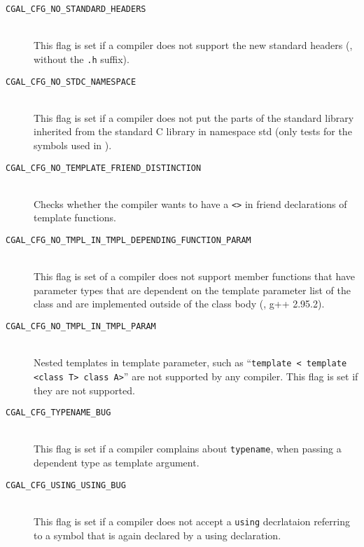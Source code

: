 \begin{description}
\item[{\tt CGAL\_CFG\_NO\_STANDARD\_HEADERS}]~\\ 
  This flag is
  set if a compiler does not support the new standard headers (\ie,
  without the {\tt .h} suffix).
 
\item[{\tt CGAL\_CFG\_NO\_STDC\_NAMESPACE}]~\\ 
  This flag is
  set if a compiler does not put the parts of the standard library
  inherited from the standard C library in namespace {\ccFont std} (only tests
  for the symbols used in \cgal).
 
\item[{\tt CGAL\_CFG\_NO\_TEMPLATE\_FRIEND\_DISTINCTION}]~\\ 
  Checks whether the compiler wants to have a \texttt{<>} in friend
  declarations of template functions.

\item[{\tt CGAL\_CFG\_NO\_TMPL\_IN\_TMPL\_DEPENDING\_FUNCTION\_PARAM}]~\\ 
  This flag is set of a compiler does not support member functions that have
  parameter types that are dependent on the template parameter list of the
  class and are implemented outside of the class body (\eg, g++ 2.95.2).
  
\item[{\tt CGAL\_CFG\_NO\_TMPL\_IN\_TMPL\_PARAM}]~\\ 
  Nested
  templates in template parameter, such as ``\texttt{template <
    template <class T> class A>}'' are not supported by any compiler.
  This flag is set if they are not supported.

\item[{\tt CGAL\_CFG\_TYPENAME\_BUG}]~\\
 This flag is set if a compiler complains about {\tt typename}, 
 when passing a dependent type as template argument.

\item[{\tt CGAL\_CFG\_USING\_USING\_BUG}]~\\
 This flag is set if a compiler does not accept a \texttt{using}
 decrlataion referring to a symbol that is again declared by a 
 using declaration.

\end{description}

